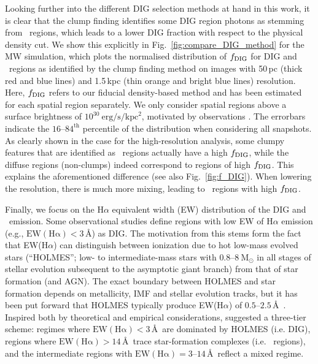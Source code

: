 \documentclass[fleqn,usenatbib]{mnras}
\newcommand\HII{\ion{H}{II}~} %
\begin{document}
Looking further into the different DIG selection methods at hand in this work, it is clear that the clump finding identifies some DIG region photons as stemming from \HII regions, which leads to a lower DIG fraction with respect to the physical density cut. We show this explicitly in Fig.~\ref{fig:compare_DIG_method} for the MW simulation, which plots the normalised distribution of $f_{\rm DIG}$ for DIG and \HII regions as identified by the clump finding method on images with 50\,pc (thick red and blue lines) and 1.5\,kpc (thin orange and bright blue lines) resolution. Here, $f_{\rm DIG}$ refers to our fiducial density-based method and has been estimated for each spatial region separately. We only consider spatial regions above a surface brightness of $10^{30}~\mathrm{erg}/\mathrm{s}/\mathrm{kpc}^{2}$, motivated by observations \citep[e.g.,][]{belfiore22}. The errorbars indicate the $16$--$84^\text{th}$ percentile of the distribution when considering all snapshots. As clearly shown in the case for the high-resolution analysis, some clumpy features that are identified as \HII regions actually have a high $f_{\rm DIG}$, while the diffuse regions (non-clumps) indeed correspond to regions of high $f_{\rm DIG}$. This explains the aforementioned difference (see also Fig.~\ref{fig:f_DIG}). When lowering the resolution, there is much more mixing, leading to \HII regions with high $f_{\rm DIG}$.

Finally, we focus on the H$\alpha$ equivalent width (EW) distribution of the DIG and \HII emission. Some observational studies \citep[e.g.,][]{lacerda18, vale-asari19} define regions with low EW of H$\alpha$ emission (e.g., $\mathrm{EW(H\alpha)}<3$\,\AA) as DIG. The motivation from this stems form the fact that EW(H$\alpha$) can distinguish between ionization due to hot low-mass evolved stars (``HOLMES''; low- to intermediate-mass stars with $0.8$--$8~\mathrm{M_{\odot}}$ in all stages of stellar evolution subsequent to the asymptotic giant branch) from that of star formation (and AGN). The exact boundary between HOLMES and star formation depends on metallicity, IMF and stellar evolution tracks, but it has been put forward that HOLMES typically produce EW(H$\alpha$) of $0.5$--$2.5$\,\AA\ \citep[e.g.,][]{cid-fernandes14, byler19}. Inspired both by theoretical and empirical considerations, \citet{lacerda18} suggested a three-tier scheme: regimes where $\mathrm{EW(H\alpha)}<3$\,\AA\ are dominated by HOLMES (i.e. DIG), regions where $\mathrm{EW(H\alpha)}>14$\,\AA\ trace star-formation complexes (i.e. \HII regions), and the intermediate regions with $\mathrm{EW(H\alpha)}=3$--$14$\,\AA\ reflect a mixed regime.
\end{document}

